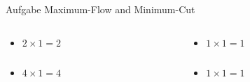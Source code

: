 \begin{frame}[allowframebreaks]{Aufgabe \thesection}{Maximum-Flow and Minimum-Cut}
\begin{solutionnoinc}
\begin{columns}
    \end{columns}
  \end{solutionnoinc}
  \begin{solutionnoinc}
    \begin{columns}
      \begin{column}{0.5\textwidth}
        \begin{itemize}
          \item $2\times 1 = 2$
        \end{itemize}
      \end{column}
      \begin{column}{0.5\textwidth}
        \begin{itemize}
          \item $1\times 1 = 1$
        \end{itemize}
      \end{column}
    \end{columns}
  \end{solutionnoinc}
  \begin{solutionnoinc}
    \begin{columns}
      \begin{column}{0.5\textwidth}
        \begin{itemize}
          \item $4\times 1 = 4$
        \end{itemize}
      \end{column}
      \begin{column}{0.5\textwidth}
        \begin{itemize}
          \item $1\times 1 = 1$
        \end{itemize}

\end{column}
\end{columns}
\end{solutionnoinc}
\end{frame}
